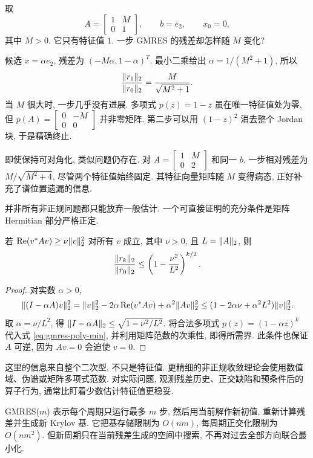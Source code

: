 \begin{example}
取
\[
A=\begin{bmatrix}1&M\\0&1\end{bmatrix},\qquad b=e_2,\qquad x_0=0,
\]
其中 $M>0$. 它只有特征值 $1$. 一步 GMRES 的残差却怎样随 $M$ 变化?
\end{example}
\begin{solution}
候选 $x=\alpha e_2$, 残差为 $(-M\alpha,1-\alpha)^T$. 最小二乘给出
$\alpha=1/(M^2+1)$, 所以
\[
\frac{\lVert r_1\rVert_2}{\lVert r_0\rVert_2}=\frac{M}{\sqrt{M^2+1}}.
\]
当 $M$ 很大时, 一步几乎没有进展. 多项式 $p(z)=1-z$ 虽在唯一特征值处为零, 但
$p(A)=\begin{bmatrix}0&-M\\0&0\end{bmatrix}$ 并非零矩阵. 第二步可以用 $(1-z)^2$ 消去整个 Jordan 块, 于是精确终止.
\end{solution}
即使保持可对角化, 类似问题仍存在. 对 $A=\begin{bmatrix}1&M\\0&2\end{bmatrix}$ 和同一 $b$, 一步相对残差为 $M/\sqrt{M^2+4}$, 尽管两个特征值始终固定. 其特征向量矩阵随 $M$ 变得病态, 正好补充了谱位置遗漏的信息.

并非所有非正规问题都只能放弃一般估计. 一个可直接证明的充分条件是矩阵 Hermitian 部分严格正定.
\begin{theorem}[正实部给出的收敛保证]\label{thm:gmres-positive-real}
若 $\operatorname{Re}(v^*Av)\ge\nu\lVert v\rVert_2^2$ 对所有 $v$ 成立, 其中 $\nu>0$, 且 $L=\lVert A\rVert_2$, 则
\[
\frac{\lVert r_k\rVert_2}{\lVert r_0\rVert_2}
\le\left(1-\frac{\nu^2}{L^2}\right)^{k/2}.
\]
\end{theorem}
\begin{proof}
对实数 $\alpha>0$,
\[
\lVert (I-\alpha A)v\rVert_2^2
=\lVert v\rVert_2^2-2\alpha\operatorname{Re}(v^*Av)+\alpha^2\lVert Av\rVert_2^2
\le(1-2\alpha\nu+\alpha^2L^2)\lVert v\rVert_2^2.
\]
取 $\alpha=\nu/L^2$, 得 $\lVert I-\alpha A\rVert_2\le\sqrt{1-\nu^2/L^2}$. 将合法多项式 $p(z)=(1-\alpha z)^k$ 代入式 \eqref{eq:gmres-poly-min}, 并利用矩阵范数的次乘性, 即得所需界. 此条件也保证 $A$ 可逆, 因为 $Av=0$ 会迫使 $v=0$.
\end{proof}
这里的信息来自整个二次型, 不只是特征值. 更精细的非正规收敛理论会使用数值域、伪谱或矩阵多项式范数. 对实际问题, 观测残差历史、正交缺陷和预条件后的算子行为, 通常比盯着少数估计特征值更稳妥.

GMRES($m$) 表示每个周期只运行最多 $m$ 步, 然后用当前解作新初值, 重新计算残差并生成新 Krylov 基. 它把基存储限制为 $O(nm)$, 每周期正交化限制为 $O(nm^2)$. 但新周期只在当前残差生成的空间中搜索, 不再对过去全部方向联合最小化.

